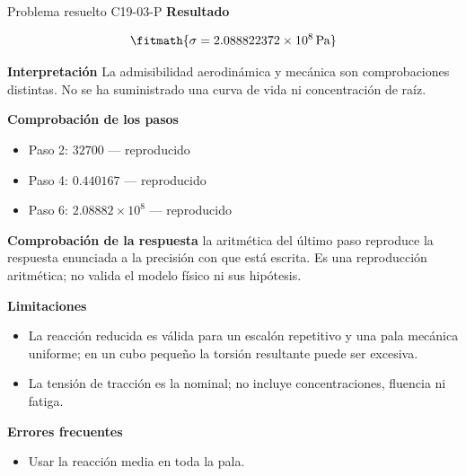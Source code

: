 \documentclass[10pt,openany]{book}
\begin{document}
\begin{studiumworked}{Problema resuelto C19-03-P}
\noindent\textbf{Resultado}

\[
\fitmath{\sigma=2.088822372\times10^{8}\,\mathrm{Pa}}
\]

\noindent\textbf{Interpretación}
La admisibilidad aerodinámica y mecánica son comprobaciones distintas. No se ha suministrado una curva de vida ni concentración de raíz.

\noindent\textbf{Comprobación de los pasos}
\begin{itemize}
\item Paso 2: $32700$ — reproducido
\item Paso 4: $0.440167$ — reproducido
\item Paso 6: $2.08882\times 10^{8}$ — reproducido
\end{itemize}

\noindent\textbf{Comprobación de la respuesta} la aritmética del último paso reproduce la respuesta enunciada a la precisión con que está escrita. Es una reproducción aritmética; no valida el modelo físico ni sus hipótesis.

\noindent\textbf{Limitaciones}
\begin{itemize}
\item La reacción reducida es válida para un escalón repetitivo y una pala mecánica uniforme; en un cubo pequeño la torsión resultante puede ser excesiva.
\item La tensión de tracción es la nominal; no incluye concentraciones, fluencia ni fatiga.
\end{itemize}

\noindent\textbf{Errores frecuentes}
\begin{itemize}
\item Usar la reacción media en toda la pala.
\end{itemize}
\begin{center}\end{center}
\end{studiumworked}
\end{document}
